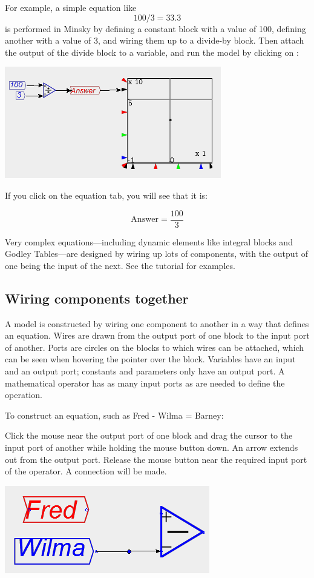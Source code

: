 For example, a simple equation like 
\[
100/3=33.3
\]
is performed in Minsky by defining a constant block with a value of
100, defining another with a value of 3, and wiring them up to a divide-by
block. Then attach the output of the divide block to a variable, and
run the model by clicking on :
\begin{center}
\includegraphics{images/NewItem129} 
\par\end{center}

If you click on the equation tab, you will see that it is:

\[
\mathrm{Answer}=\frac{100}{3}
\]

Very complex equations---including dynamic elements like integral
blocks and Godley Tables---are designed by wiring up lots of components,
with the output of one being the input of the next. See the tutorial
for examples.

\subsection{Wiring components together}

A model is constructed by wiring one component to another in a way
that defines an equation. Wires are drawn from the output port of
one block to the input port of another. Ports are circles on the blocks
to which wires can be attached, which can be seen when hovering the
pointer over the block. Variables have an input and an output port;
constants and parameters only have an output port. A mathematical
operator has as many input ports as are needed to define the operation.

To construct an equation, such as Fred - Wilma = Barney:

Click the mouse near the output port of one block and drag the cursor
to the input port of another while holding the mouse button down.
An arrow extends out from the output port. Release the mouse button
near the required input port of the operator. A connection will be
made.
\begin{center}
\includegraphics{images/NewItem181} 
\par\end{center}

